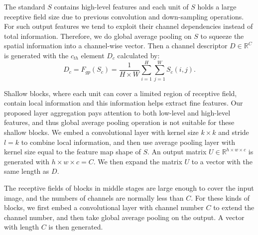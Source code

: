 \documentclass[conference]{IEEEtran}
\begin{document}
The standard $S$ contains high-level features and each unit of $S$ holds a large receptive field size due to previous convolution and down-sampling operations. For such output features we tend to exploit their channel dependencies instead of total information. Therefore, we do global average pooling on $S$ to squeeze the spatial information into a channel-wise vector. Then a channel descriptor $D\in \mathbb{R}^C$ is generated with the $c_{th}$ element $D_c$ calculated by:
\begin{equation}
D_c = F_{gp}(S_c) = \frac{1}{H\times W}\sum_{i=1}^H\sum_{j=1}^W S_c(i,j).
\end{equation}

Shallow blocks, where each unit can cover a limited region of receptive field, contain local information and this information helps extract fine features. Our proposed layer aggregation pays attention to both low-level and high-level features,  and thus global average pooling operation is not suitable for these shallow blocks. We embed a convolutional layer with kernel size $k\times k$ and stride $l=k$ to combine local information, and then use average pooling layer with kernel size equal to the feature map shape of $S$.  An output matrix $U\in \mathbb{R}^{h\times w\times c}$ is generated with $h\times w\times c=C$.  We then expand the matrix $U$ to a vector with the same length as $D$.

The receptive fields of  blocks in middle stages are large enough to cover the input image, and the numbers of channels are normally less than $C$. For these kinds of blocks, we first embed a convolutional layer with channel number $C$ to extend the channel number, and then take global average pooling on the output. A vector with length $C$ is then generated.
\end{document}
